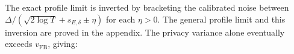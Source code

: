 The exact profile limit is inverted by bracketing the calibrated noise between
$\Delta/(\sqrt{2\log T}+s_{E,\delta}\pm\eta)$ for each $\eta>0$.
The general profile limit and this inversion are proved in the appendix.
The privacy variance alone eventually exceeds $v_{\mathrm{FB}}$, giving:

